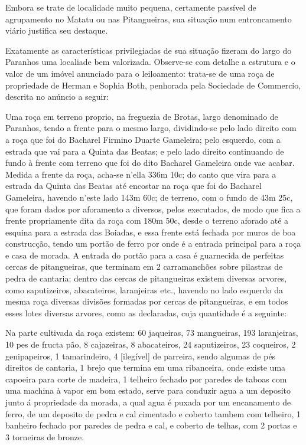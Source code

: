 Embora se trate de localidade muito pequena, certamente passível de agrupamento no Matatu ou nas Pitangueiras, sua situação num entroncamento viário justifica seu destaque.

Exatamente as características privilegiadas de sua situação fizeram do largo do Paranhos uma localiade bem valorizada. Observe-se com detalhe a estrutura e o valor de um imóvel anunciado para o leiloamento: trata-se de uma roça de propriedade de Herman e Sophia Both, penhorada pela Sociedade de Commercio, descrita no anúncio a seguir:

\begin{citacao}
Uma roça em terreno proprio, na freguezia de Brotas, largo denominado de Paranhos, tendo a frente para o mesmo largo, dividindo-se pelo lado direito com a roça que foi do Bacharel Firmino Duarte Gameleira; pelo esquerdo, com a estrada que vai para a Quinta das Beatas; e pelo lado direito continuando de fundo à frente com terreno que foi do dito Bacharel Gameleira onde vae acabar. Medida a frente da roça, acha-se n'ella 336m 10c; do canto que vira para a estrada da Quinta das Beatas até encostar na roça que foi do Bacharel Gameleira, havendo n'este lado 143m 60c; de terreno, com o fundo de 43m 25c, que foram dados por aforamento a diversos, pelos executados, de modo que fica a frente propriamente dita da roça com 180m 50c, desde o terreno aforado até a esquina para a estrada das Boiadas, e essa frente está fechada por muros de boa construcção, tendo um portão de ferro por onde é a entrada principal para a roça e casa de morada. A entrada do portão para a casa é guarnecida de perfeitas cercas de pitangueiras, que terminam em 2 carramanchões sobre pilastras de pedra de cantaria; dentro das cercas de pitangueiras existem diversas arvores, como saputizeiros, abacateiros, laranjeiras etc., havendo no lado esquerdo da mesma roça diversas divisões formadas por cercas de pitangueiras, e em todos esses lotes diversas arvores, como as declaradas, cuja quantidade é a seguinte:

Na parte cultivada da roça existem: 60 jaqueiras, 73 mangueiras, 193 laranjeiras, 10 pes de fructa pão, 8 cajazeiras, 8 abacateiros, 24 saputizeiros, 23 coqueiros, 2 genipapeiros, 1 tamarindeiro, 4 [ilegível] de parreira, sendo algumas de pés direitos de cantaria, 1 brejo que termina em uma ribanceira, onde existe uma capoeira para corte de madeira, 1 telheiro fechado por paredes de taboas com uma machina à vapor em bom estado, serve para conduzir agua a um deposito junto á propriedade da morada, a qual agua é puxada por um encanamento de ferro, de um deposito de pedra e cal cimentado e coberto tambem com telheiro, 1 banheiro fechado por paredes de pedra e cal, e coberto de telhas, com 2 portas e 3 torneiras de bronze.


\end{citacao}
